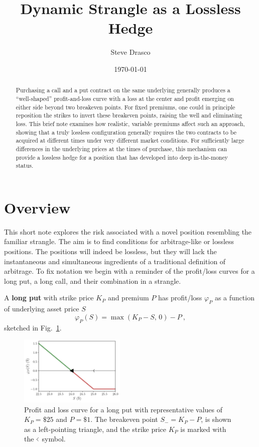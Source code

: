 \documentclass[aps,reprint]{revtex4-2}
\begin{document}
\title{Dynamic Strangle as a Lossless Hedge}
\author{Steve Drasco}
\date{\today}

\begin{abstract}
Purchasing a call and a put contract on the same underlying generally produces a “well-shaped” profit-and-loss curve with a loss at the center and profit emerging on either side beyond two breakeven points. For fixed premiums, one could in principle reposition the strikes to invert these breakeven points, raising the well and eliminating loss. This brief note examines how realistic, variable premiums affect such an approach, showing that a truly lossless configuration generally requires the two contracts to be acquired at different times under very different market conditions. For sufficiently large differences in the underlying prices at the times of purchase, this mechanism can provide a lossless hedge for a position that has developed into deep in-the-money status.
\end{abstract}

\maketitle

\section{Overview}

This short note explores the risk associated with a novel position resembling the familiar strangle.  The aim is to find conditions for arbitrage-like or lossless positions. The positions will indeed be lossless, but they will lack the instantaneous and simultaneous ingredients of a traditional definition of arbitrage.  To fix notation we begin with a reminder of the profit/loss curves for a long put, a long call, and their combination in a strangle. 

A \textbf{long put} with strike price $K_P$ and premium $P$ has profit/loss $\varphi_P$ as a function of underlying asset price $S$
\begin{equation}
\varphi_P(S) = \max(K_P - S,\,0) - P~,
\end{equation}
sketched in Fig.~\ref{fig:put}.
\begin{figure}[hb]
    \centering
    \includegraphics[width=0.45\textwidth]{figs/put.pdf}
    \caption{Profit and loss curve for a long put with representative values of $K_P = \$25$ and $P = \$1$.  The breakeven point $S_- = K_P - P$, is shown as a left-pointing triangle, and the strike price $K_P$ is marked with the $ \scalebox{0.5}[1]{$<$} $ symbol.}
    \label{fig:put}
\end{figure}
\end{document}
